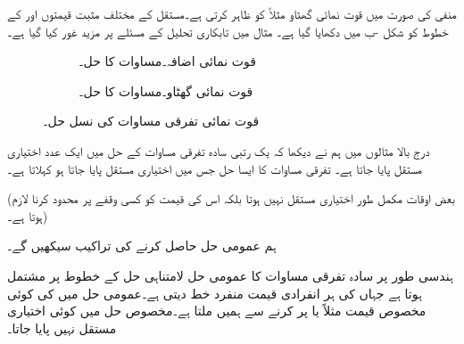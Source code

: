 منفی  کی صورت میں  قوت نمائی گھٹاو مثلاً  کو ظاہر کرتی ہے۔مستقل  کے مختلف مثبت قیمتوں اور  کے خطوط کو شکل -ب میں دکھایا گیا ہے۔ مثال  میں تابکاری تحلیل کے مسئلے پر مزید غور کیا گیا ہے۔
\begin{figure}
\centering
\begin{subfigure}{0.45\textwidth}
\centering
{}
\caption{ قوت نمائی اضافہ۔مساوات  کا حل۔}
\end{subfigure}\hfill
\begin{subfigure}{0.45\textwidth}
\centering
{}
\caption{قوت نمائی گھٹاو۔مساوات  کا حل۔}
\end{subfigure} 
\caption{قوت نمائی تفرقی مساوات کی نسل حل۔}
\label{شکل_مثال_تفرقی_اول_مالتُھس_الف}
\end{figure}

درج بالا مثالوں میں ہم نے دیکھا کہ یک رتبی سادہ تفرقی مساوات کے حل میں ایک عدد اختیاری مستقل  پایا جاتا ہے۔ تفرقی مساوات کا ایسا حل جس میں اختیاری مستقل  پایا جاتا ہو  کہلاتا ہے۔

(بعض اوقات  مکمل طور اختیاری مستقل نہیں ہوتا بلکہ اس کی قیمت کو کسی وقفے پر محدود کرنا لازم ہوتا ہے۔)

ہم  عمومی حل حاصل کرنے کی تراکیب سیکھیں گے۔

ہندسی طور پر سادہ تفرقی مساوات کا عمومی حل لامتناہی حل کے خطوط پر مشتمل ہوتا ہے جہاں  کی ہر انفرادی قیمت منفرد خط دیتی ہے۔عمومی حل میں  کی کوئی مخصوص قیمت مثلاً  یا  پر کرنے سے ہمیں  ملتا ہے۔مخصوص حل میں کوئی اختیاری مستقل نہیں پایا جاتا۔

